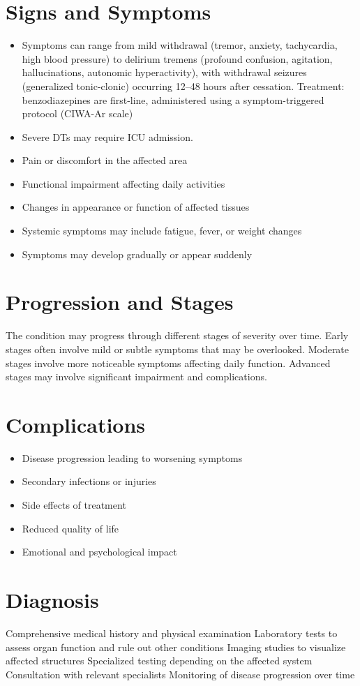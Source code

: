 \section{Signs and Symptoms}
\begin{itemize}[noitemsep]
  \item Symptoms can range from mild withdrawal (tremor, anxiety, tachycardia, high blood pressure) to delirium tremens (profound confusion, agitation, hallucinations, autonomic hyperactivity), with withdrawal seizures (generalized tonic-clonic) occurring 12--48 hours after cessation. Treatment: benzodiazepines are first-line, administered using a symptom-triggered protocol (CIWA-Ar scale)
  \item Severe DTs may require ICU admission.
  \item Pain or discomfort in the affected area
  \item Functional impairment affecting daily activities
  \item Changes in appearance or function of affected tissues
  \item Systemic symptoms may include fatigue, fever, or weight changes
  \item Symptoms may develop gradually or appear suddenly
\end{itemize}
\section{Progression and Stages}
The condition may progress through different stages of severity over time. Early stages often involve mild or subtle symptoms that may be overlooked. Moderate stages involve more noticeable symptoms affecting daily function. Advanced stages may involve significant impairment and complications.
\section{Complications}
\begin{itemize}[noitemsep]
  \item Disease progression leading to worsening symptoms
  \item Secondary infections or injuries
  \item Side effects of treatment
  \item Reduced quality of life
  \item Emotional and psychological impact
\end{itemize}
\section{Diagnosis}
Comprehensive medical history and physical examination Laboratory tests to assess organ function and rule out other conditions Imaging studies to visualize affected structures Specialized testing depending on the affected system Consultation with relevant specialists Monitoring of disease progression over time

